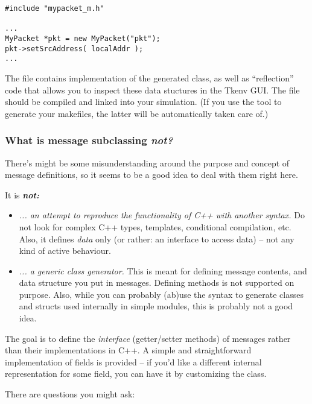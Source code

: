 \begin{verbatim}
#include "mypacket_m.h"

...
MyPacket *pkt = new MyPacket("pkt");
pkt->setSrcAddress( localAddr );
...
\end{verbatim}

The  file contains implementation of the generated 
class, as well as ``reflection'' code that allows you to inspect these data
stuctures in the Tkenv GUI. The  file should be compiled and
linked into your simulation. (If you use the  tool
to generate your makefiles, the latter will be automatically taken care of.)


\subsubsection{What is message subclassing \textit{not?}}

There's might be some misunderstanding around the purpose and
concept of message definitions, so it seems to be a good idea
to deal with them right here.

It is \textit{\textbf{not:}}

\begin{itemize}
  \item{\textit{... an attempt to reproduce the functionality of C++ with another
     syntax.} Do not look for complex C++ types, templates, conditional compilation, etc.
     Also, it defines \textit{data} only (or rather: an interface to access
     data) -- not any kind of active behaviour.}
  \item{\textit{... a generic class generator.} This is meant for defining message
     contents, and data structure you put in messages.
     Defining methods is not supported on purpose.
     Also, while you can probably (ab)use the syntax to
     generate classes and structs used internally in simple modules,
     this is probably not a good idea.}
\end{itemize}

The goal is to define the \textit{interface} (getter/setter methods) of messages
rather than their implementations in C++. A simple and straightforward
implementation of fields is provided -- if you'd like a different internal
representation for some field, you can have it by customizing the class.

There are questions you might ask:

